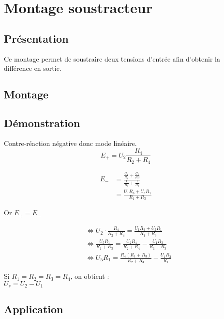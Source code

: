 



\chapter{Montage soustracteur}
\section{Présentation}
Ce montage permet de soustraire deux tensions d’entrée afin d’obtenir la différence en sortie.

\section{Montage}


\section{Démonstration}


Contre-réaction négative donc mode linéaire.\\


$$E_+=U_2\frac{R_4}{R_2+R_4}$$

\begin{align}
E_-&=\frac{\frac{U_1}{R_1}+\frac{U_5}{R3}}{\frac{1}{R_1}+\frac{1}{R_3}}\\
&=\frac{U_1R_3+U_5R_1}{R_1+R_3}
\end{align}

Or $E_+=E_-$

\begin{align}
&\Leftrightarrow U_2 \cdot \frac{R_4}{R_2+R_4} = \frac{U_1R_3+U_5R_1}{R_1+R_3} \\
&\Leftrightarrow  \frac{U_5R_1}{R_1+R_3} = \frac{U_2R_4}{R_2+R_4} -\frac{U_1R_3}{R_1+R_3} \\
&\Leftrightarrow  U_5R_1 = \frac{R_4(R_1+R_3)}{R_2+R_4} - \frac{U_1R_3}{R_1} 
\end{align}


Si $R_1=R_2=R_3=R_4$, on obtient : \\

$U_s=U_2-U_1$\\

\section{Application}

